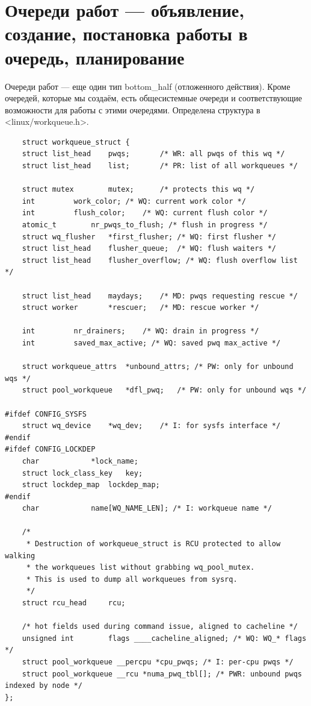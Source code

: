 \section{Очереди работ --- объявление, создание, постановка работы в очередь, планирование}

Очереди работ --- еще один тип bottom\_half (отложенного действия). Кроме очередей, которые мы создаём, есть общесистемные очереди и соответствующие возможности для работы с этими очередями. Определена структура в <linux/workqueue.h>.

\begin{lstlisting}
	struct workqueue_struct {
	struct list_head	pwqs;		/* WR: all pwqs of this wq */
	struct list_head	list;		/* PR: list of all workqueues */

	struct mutex		mutex;		/* protects this wq */
	int			work_color;	/* WQ: current work color */
	int			flush_color;	/* WQ: current flush color */
	atomic_t		nr_pwqs_to_flush; /* flush in progress */
	struct wq_flusher	*first_flusher;	/* WQ: first flusher */
	struct list_head	flusher_queue;	/* WQ: flush waiters */
	struct list_head	flusher_overflow; /* WQ: flush overflow list */

	struct list_head	maydays;	/* MD: pwqs requesting rescue */
	struct worker		*rescuer;	/* MD: rescue worker */

	int			nr_drainers;	/* WQ: drain in progress */
	int			saved_max_active; /* WQ: saved pwq max_active */

	struct workqueue_attrs	*unbound_attrs;	/* PW: only for unbound wqs */
	struct pool_workqueue	*dfl_pwq;	/* PW: only for unbound wqs */

#ifdef CONFIG_SYSFS
	struct wq_device	*wq_dev;	/* I: for sysfs interface */
#endif
#ifdef CONFIG_LOCKDEP
	char			*lock_name;
	struct lock_class_key	key;
	struct lockdep_map	lockdep_map;
#endif
	char			name[WQ_NAME_LEN]; /* I: workqueue name */

	/*
	 * Destruction of workqueue_struct is RCU protected to allow walking
	 * the workqueues list without grabbing wq_pool_mutex.
	 * This is used to dump all workqueues from sysrq.
	 */
	struct rcu_head		rcu;

	/* hot fields used during command issue, aligned to cacheline */
	unsigned int		flags ____cacheline_aligned; /* WQ: WQ_* flags */
	struct pool_workqueue __percpu *cpu_pwqs; /* I: per-cpu pwqs */
	struct pool_workqueue __rcu *numa_pwq_tbl[]; /* PWR: unbound pwqs indexed by node */
};
\end{lstlisting}

